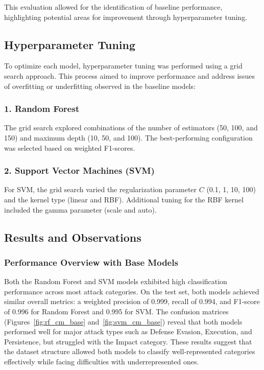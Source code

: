         This evaluation allowed for the identification of baseline performance, highlighting potential areas for improvement through hyperparameter tuning.

    \subsection{Hyperparameter Tuning}
    
        To optimize each model, hyperparameter tuning was performed using a grid search approach. This process aimed to improve performance and address issues of overfitting or underfitting observed in the baseline models:

        \subsubsection*{1. Random Forest \\}
        
            The grid search explored combinations of the number of estimators (50, 100, and 150) and maximum depth (10, 50, and 100). The best-performing configuration was selected based on weighted F1-scores.

        \subsubsection*{2. Support Vector Machines (SVM) \\}
        
            For SVM, the grid search varied the regularization parameter \( C \) (0.1, 1, 10, 100) and the kernel type (linear and RBF). Additional tuning for the RBF kernel included the gamma parameter (scale and auto).

    \subsection{Results and Observations}
            
        \subsubsection*{Performance Overview with Base Models\\}
            
            Both the Random Forest and SVM models exhibited high classification performance across most attack categories. On the test set, both models achieved similar overall metrics: a weighted precision of 0.999, recall of 0.994, and F1-score of 0.996 for Random Forest and 0.995 for SVM. The confusion matrices (Figures~\ref{fig:rf_cm_base} and~\ref{fig:svm_cm_base}) reveal that both models performed well for major attack types such as Defense Evasion, Execution, and Persistence, but struggled with the Impact category. These results suggest that the dataset structure allowed both models to classify well-represented categories effectively while facing difficulties with underrepresented ones.
            
